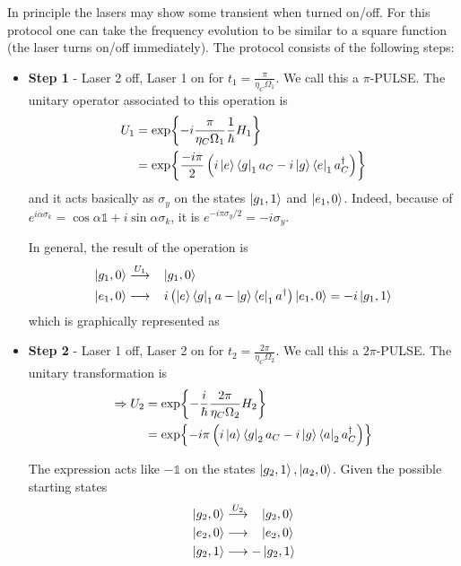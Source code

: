 \noindent In principle the lasers may show some transient when turned on/off. For this protocol one can take the frequency evolution to be similar to a square function (the laser turns on/off immediately). The protocol consists of the following steps:

\begin{itemize}

\item \textbf{Step 1} - Laser 2 off, Laser 1 on for $t_1 = \frac{\pi}{\eta_C\Omega_1}$. We call this a $\pi$-PULSE. 
    The unitary operator associated to this operation is
    \begin{align*}
    U_1 &= \exp{ -i\frac{\pi}{\eta_C\Omega_1} \frac{1}{\hbar} H_1 }\\%
    & = \exp{ \frac{ -i \pi}{2}
        \left( i \ket{e}\bra{g}_1a_C - i \ket{g}\bra{e}_1a^\dag_C \right)
    }
    \end{align*}
    and it acts basically as $\sigma_y$ on the states $\ket{g_1, 1}$ and $\ket{e_1, 0}$. 
    Indeed, because of
    $e^{i\alpha\sigma_k} = \cos\alpha \mathds{1} + i \sin\alpha \sigma_k$,
    it is $e^{-i\pi\sigma_y/2} = -i \sigma_y$.
    
    In general, the result of the operation is
    \begin{align*}
        \ket{g_1,0} & \overset{U_1}{\longrightarrow} \;\;\; \ket{g_1, 0}\\
        \ket{e_1, 0} & \longrightarrow
            \;\;\; i\left(\ket{e}\bra{g}_1a - \ket{g}\bra{e}_1a^\dag\right)\ket{e_1, 0} = -i \ket{g_1, 1} 
    \end{align*}
    which is graphically represented as
    \begin{center}
    
    \end{center}

\item \textbf{Step 2} - Laser 1 off, Laser 2 on for $t_2 = \frac{2\pi}{\eta_C\Omega_2}$. We call this a $2\pi$-PULSE.
    The unitary transformation is
    \begin{align*}
    \Rightarrow U_2 &= \exp{ -\frac{i}{\hbar}\frac{2\pi}{\eta_C\Omega_2} H_2 }\\
    & = \exp{ -i\pi \left(
        i\ket{a}\bra{g}_2a_C - 
        i\ket{g}\bra{a}_2a_C^\dag
    \right)
    }
    \end{align*}
    
    The expression acts like $-\mathds{1}$ on the states $\ket{g_2,1}, \ket{a_2, 0}$. Given the possible starting states
    \begin{align*}
        \ket{g_2,0} & \overset{U_2}{\longrightarrow} \;\;\; \ket{g_2, 0}\\
        \ket{e_2, 0} & \longrightarrow \;\;\; \ket{e_2, 0}\\
        \ket{g_2, 1} & \longrightarrow - \ket{g_2, 1}
    \end{align*}
    

\end{itemize}
